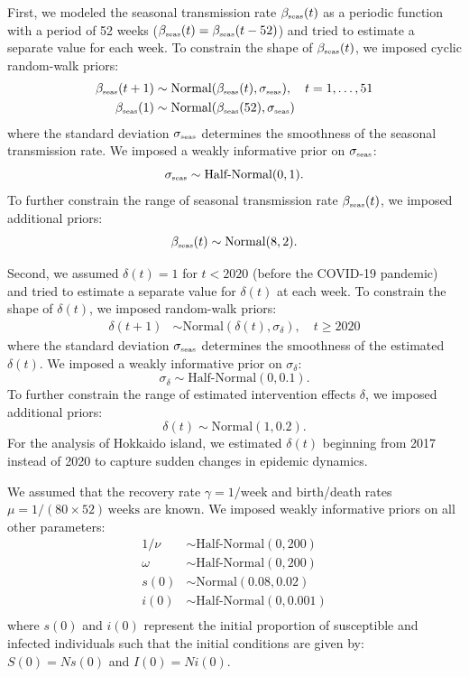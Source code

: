 \documentclass[12pt]{article}
\newcommand{\tsub}[2]{#1_{{\textrm{\tiny #2}}}}
\begin{document}
First, we modeled the seasonal transmission rate $\tsub{\beta}{seas}(t)$ as a periodic function with a period of 52 weeks ($\tsub{\beta}{seas}(t) = \tsub{\beta}{seas}(t-52)$) and tried to estimate a separate value for each week.
To constrain the shape of $\tsub{\beta}{seas}(t)$, we imposed cyclic random-walk priors:
\begin{align}
\tsub{\beta}{seas}(t+1) &\sim \mathrm{Normal}(\tsub{\beta}{seas}(t), \tsub{\sigma}{seas}), \quad t=1,\dots,51  \\
\tsub{\beta}{seas}(1) &\sim \mathrm{Normal}(\tsub{\beta}{seas}(52), \tsub{\sigma}{seas})
\end{align}
where the standard deviation $\tsub{\sigma}{seas}$ determines the smoothness of the seasonal transmission rate.
We imposed a weakly informative prior on $\tsub{\sigma}{seas}$:
\begin{equation}
\tsub{\sigma}{seas} \sim \textrm{Half-Normal}(0, 1).
\end{equation}
To further constrain the range of seasonal transmission rate $\tsub{\beta}{seas}(t)$, we imposed additional priors:
\begin{equation}
\tsub{\beta}{seas}(t) \sim \mathrm{Normal}(8, 2).
\end{equation}

Second, we assumed $\delta(t) = 1$ for $t < 2020$ (before the COVID-19 pandemic) and tried to estimate a separate value for $\delta(t)$ at each week.
To constrain the shape of $\delta(t)$, we imposed random-walk priors:
\begin{align}
\delta(t+1) &\sim \mathrm{Normal}(\delta(t), \sigma_\delta), \quad t \geq 2020
\end{align}
where the standard deviation $\tsub{\sigma}{seas}$ determines the smoothness of the estimated $\delta(t)$.
We imposed a weakly informative prior on $\sigma_\delta$:
\begin{equation}
\sigma_\delta \sim \textrm{Half-Normal}(0, 0.1).
\end{equation}
To further constrain the range of estimated intervention effects $\delta$, we imposed additional priors:
\begin{equation}
\delta(t) \sim \mathrm{Normal}(1, 0.2).
\end{equation}
For the analysis of Hokkaido island, we estimated $\delta(t)$ beginning from 2017 instead of 2020 to capture sudden changes in epidemic dynamics.

We assumed that the recovery rate $\gamma = 1/\mathrm{week}$ and birth/death rates $\mu = 1/(80\times 52)\,\mathrm{weeks}$ are known.
We imposed weakly informative priors on all other parameters:
\begin{align}
1/\nu &\sim \textrm{Half-Normal}(0, 200)\\
\omega &\sim \textrm{Half-Normal}(0, 200)\\
s(0) &\sim \textrm{Normal}(0.08, 0.02)\\
i(0) &\sim \textrm{Half-Normal}(0, 0.001)\\
\end{align}
where $s(0)$ and $i(0)$ represent the initial proportion of susceptible and infected individuals such that the initial conditions are given by: $S(0) = Ns(0)$ and $I(0) = N i(0)$.
\end{document}
